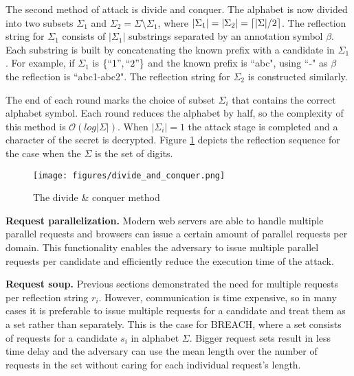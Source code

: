 The second method of attack is divide and conquer. The alphabet is now divided
into two subsets $\Sigma_1$ and $\Sigma_2 = \Sigma \setminus \Sigma_1$, where
$|\Sigma_1| = |\Sigma_2| = \lceil|\Sigma| / 2\rceil$. The reflection string for
$\Sigma_1$ consists of $|\Sigma_1|$ substrings separated by an annotation symbol
$\beta$. Each substring is built by concatenating the known prefix with a
candidate in $\Sigma_1$. For example, if $\Sigma_1$ is $\{``1", ``2"\}$ and the
known prefix is ``abc", using ``-" as $\beta$ the reflection is ``abc1-abc2".
The reflection string for $\Sigma_2$ is constructed similarly.

The end of each round marks the choice of subset $\Sigma_i$ that contains the
correct alphabet symbol. Each round reduces the alphabet by half, so the
complexity of this method is $\mathcal{O}(log|\Sigma|)$. When $|\Sigma_i| = 1$
the attack stage is completed and a character of the secret is decrypted.
Figure \ref{fig:divide_and_conquer} depicts the reflection sequence for the case
when the $\Sigma$ is the set of digits.

   \begin{figure}[thpb]
      \centering
          \texttt{[image: figures/divide\_and\_conquer.png]}
      \caption{The divide \& conquer method}
      \label{fig:divide_and_conquer}
   \end{figure}

\noindent \textbf{Request parallelization.}\label{subsec:parallel}
Modern web servers are able to handle multiple parallel requests and
browsers can issue a certain amount of parallel requests per domain. This
functionality enables the adversary to issue multiple parallel requests per
candidate and efficiently reduce the execution time of the attack.

\noindent \textbf{Request soup.}
Previous sections demonstrated the need for multiple requests per reflection
string $r_i$. However, communication is time expensive, so in many cases it is
preferable to issue multiple requests for a candidate and treat them as a set
rather than separately. This is the case for BREACH, where a set consists of
requests for a candidate $s_i$ in alphabet $\Sigma$. Bigger request sets result
in less time delay and the adversary can use the mean length over the number of
requests in the set without caring for each individual request's length.
